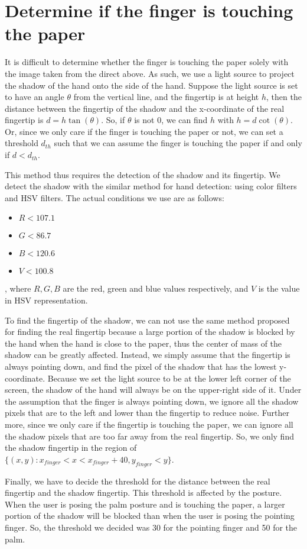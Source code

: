 \section{Determine if the finger is touching the paper}
It is difficult to determine whether the finger is touching the paper solely with the image taken from the direct above. As such, we use a light source to project the shadow of the hand onto the side of the hand. Suppose the light source is set to have an angle $\theta$ from the vertical line, and the fingertip is at height $h$, then the distance between the fingertip of the shadow and the x-coordinate of the real fingertip is $d = h \tan(\theta)$. So, if $\theta$ is not $0$, we can find $h$ with $h = d \cot(\theta)$. Or, since we only care if the finger is touching the paper or not, we can set a threshold $d_{th}$ such that we can assume the finger is touching the paper if and only if $d < d_{th}$. 

This method thus requires the detection of the shadow and its fingertip. We detect the shadow with the similar method for hand detection: using color filters and HSV filters. The actual conditions we use are as follows:
\begin{itemize}
\item
$R < 107.1 $\\
\item
$G < 86.7 $\\
\item
$B < 120.6 $\\
\item
$V < 100.8 $\\
\end{itemize}
, where $R, G, B$ are the red, green and blue values respectively, and $V$ is the value in HSV representation. 

To find the fingertip of the shadow, we can not use the same method proposed for finding the real fingertip because a large portion of the shadow is blocked by the hand when the hand is close to the paper, thus the center of mass of the shadow can be greatly affected.  Instead, we simply assume that the fingertip is always pointing down, and find the pixel of the shadow that has the lowest y-coordinate. Because we set the light source to be at the lower left corner of the screen, the shadow of the hand will always be on the upper-right side of it. Under the assumption that the finger is always pointing down, we ignore all the shadow pixels that are to the left and lower than the fingertip to reduce  noise. Further more, since we only care if the fingertip is touching the paper, we can ignore all the shadow pixels that are too far away from the real fingertip. So, we only find the shadow fingertip in the region of $\{(x,y): x_{finger}<x<x_{finger}+40, y_{finger}<y\}$. 

Finally, we have to decide the threshold for the distance between the real fingertip and the shadow fingertip. This threshold is affected by the posture. When the user is posing the palm posture and is touching the paper, a larger portion of the shadow will be blocked than when the user is posing the pointing finger. So, the threshold we decided was 30 for the pointing finger and 50 for the palm. 

